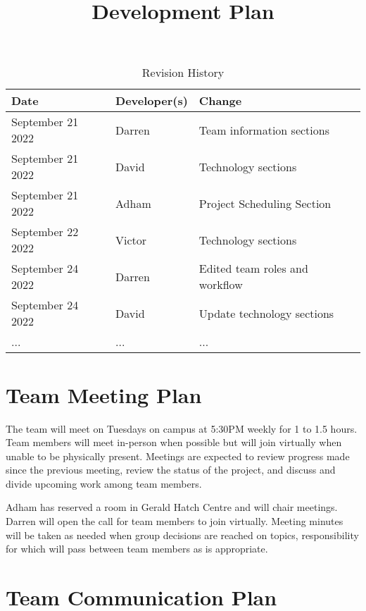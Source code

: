 \documentclass{article}
\title{Development Plan\\\progname}
\author{\authname}
\date{}
\begin{document}
\begin{table}[hp]
\caption{Revision History} \label{TblRevisionHistory}
\begin{tabularx}{\textwidth}{llX}
\toprule
\textbf{Date} & \textbf{Developer(s)} & \textbf{Change}\\
\midrule
September 21 2022 & Darren & Team information sections\\
September 21 2022 & David & Technology sections\\
September 21 2022 & Adham & Project Scheduling Section\\
September 22 2022 & Victor & Technology sections\\
September 24 2022 & Darren & Edited team roles and workflow\\
September 24 2022 & David & Update technology sections\\
... & ... & ...\\
\bottomrule
\end{tabularx}
\end{table}

\newpage

\maketitle


\section{Team Meeting Plan}

The team will meet on Tuesdays on campus at 5:30PM weekly for 1 to 1.5 hours. Team members will meet in-person when possible but will join virtually when unable to be physically present. Meetings are expected to review progress made since the previous meeting, review the status of the project, and discuss and divide upcoming work among team members.

Adham has reserved a room in Gerald Hatch Centre and will chair meetings. Darren will open the call for team members to join virtually. Meeting minutes will be taken as needed when group decisions are reached on topics, responsibility for which will pass between team members as is appropriate.

\section{Team Communication Plan}
\end{document}

